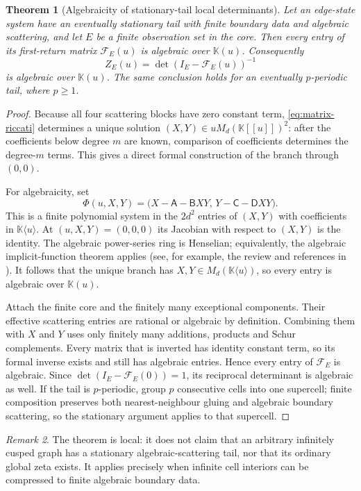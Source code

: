 \documentclass[11pt,reqno]{amsart}
\numberwithin{equation}{section}
\newtheorem{theorem}{Theorem}[section]
\theoremstyle{definition}
\theoremstyle{remark}
\newtheorem{remark}[theorem]{Remark}
\newcommand{\cF}{\mathcal F}
\begin{document}
\begin{theorem}[Algebraicity of stationary-tail local determinants]
\label{thm:stationary-algebraicity}
Let an edge-state system have an eventually stationary tail with finite
boundary data and algebraic scattering, and let $E$ be a finite observation
set in the core.  Then every entry of its first-return matrix $\cF_E(u)$ is
algebraic over $\mathbb K(u)$.  Consequently
\[
 Z_E(u)=\det(I_E-\cF_E(u))^{-1}
\]
is algebraic over $\mathbb K(u)$.  The same conclusion holds for an eventually
$p$-periodic tail, where $p\ge1$.
\end{theorem}

\begin{proof}
Because all four scattering blocks have zero constant term,
\eqref{eq:matrix-riccati} determines a unique solution
$(X,Y)\in uM_d(\mathbb K[[u]])^2$: after the coefficients below degree $m$
are known, comparison of coefficients determines the degree-$m$ terms.  This
gives a direct formal construction of the branch through $(0,0)$.

For algebraicity, set
\[
 \Phi(u,X,Y)=
 \bigl(X-\mathsf A-\mathsf BXY,\,
       Y-\mathsf C-\mathsf DXY\bigr).
\]
This is a finite polynomial system in the $2d^2$ entries of $(X,Y)$ with
coefficients in $\mathbb K\langle u\rangle$.  At
$(u,X,Y)=(0,0,0)$ its Jacobian with respect to $(X,Y)$ is the identity.
The algebraic power-series ring is Henselian; equivalently, the algebraic
implicit-function theorem applies (see, for example, the review and
references in \cite{Rond2018}).  It follows that the unique branch has
$X,Y\in M_d(\mathbb K\langle u\rangle)$, so every entry is algebraic over
$\mathbb K(u)$.

Attach the finite core and the finitely many exceptional components.  Their
effective scattering entries are rational or algebraic by definition.
Combining them with $X$ and $Y$ uses only finitely many additions, products
and Schur complements.  Every matrix that is inverted has identity constant
term, so its formal inverse exists and still has algebraic entries.  Hence
every entry of $\cF_E$ is algebraic.  Since
$\det(I_E-\cF_E(0))=1$, its reciprocal determinant is algebraic as well.  If the
tail is $p$-periodic, group $p$ consecutive cells into one supercell; finite
composition preserves both nearest-neighbour gluing and algebraic boundary
scattering, so the stationary argument applies to that supercell.
\end{proof}

\begin{remark}
The theorem is local: it does not claim that an arbitrary infinitely cusped
graph has a stationary algebraic-scattering tail, nor that its ordinary
global zeta exists.  It applies precisely when infinite cell interiors can be
compressed to finite algebraic boundary data.
\end{remark}
\end{document}
